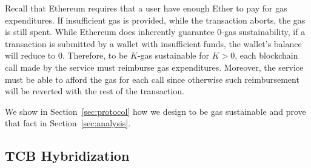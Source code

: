 Recall that Ethereum requires that a user have enough Ether to pay for gas expenditures.
If insufficient gas is provided, while the transaction aborts, the gas is still spent.
While Ethereum does inherently guarantee 0-gas sustainability, if a transaction is submitted by a wallet with insufficient funds, the wallet's balance will reduce to 0.
Therefore, to be $K$-gas sustainable for $K > 0$, each blockchain call made by the service must reimburse gas expenditures.
Moreover, the service must be able to afford the gas for each call since otherwise such reimbursement will be reverted with the rest of the transaction.

We show in Section~\ref{sec:protocol} how we design \tc to be gas sustainable and prove that fact in Section~\ref{sec:analysis}.

\subsection{TCB Hybridization}
\label{sec:tcb-hybridization}

\newcommand{\tcboff}{\ensuremath{\textsf{prog}_{\textsf{Off}}}\xspace}
\newcommand{\tcbon}{\ensuremath{\mathcal{F}_{\textsf{On}}}\xspace}
\newcommand{\oauth}{\ensuremath{\mathcal{O}_{\textsf{Auth}}}\xspace}
\newcommand{\pkoff}{\ensuremath{\textsf{pk}_{\textsf{Off}}}\xspace}


